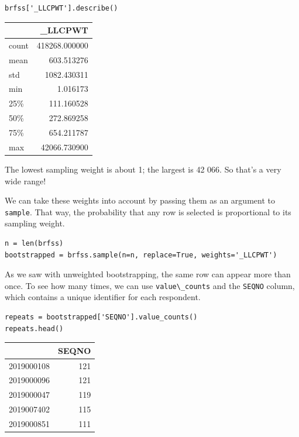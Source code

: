 \begin{lstlisting}[]
brfss['_LLCPWT'].describe()
\end{lstlisting}

\begin{tabular}{lr}
\midrule
{} &        \_LLCPWT \\
\midrule
count &  418268.000000 \\
mean  &     603.513276 \\
std   &    1082.430311 \\
min   &       1.016173 \\
25\%   &     111.160528 \\
50\%   &     272.869258 \\
75\%   &     654.211787 \\
max   &   42066.730900 \\
\midrule
\end{tabular}

The lowest sampling weight is about 1; the largest is 42 066. So that's
a very wide range!

We can take these weights into account by passing them as an argument to
\passthrough{\lstinline!sample!}. That way, the probability that any row
is selected is proportional to its sampling weight.

\begin{lstlisting}[]
n = len(brfss)
bootstrapped = brfss.sample(n=n, replace=True, weights='_LLCPWT')
\end{lstlisting}

As we saw with unweighted bootstrapping, the same row can appear more
than once. To see how many times, we can use
\passthrough{\lstinline!value\_counts!} and the
\passthrough{\lstinline!SEQNO!} column, which contains a unique
identifier for each respondent.

\begin{lstlisting}[]
repeats = bootstrapped['SEQNO'].value_counts()
repeats.head()
\end{lstlisting}

\begin{tabular}{lr}
\midrule
{} &  SEQNO \\
\midrule
2019000108 &    121 \\
2019000096 &    121 \\
2019000047 &    119 \\
2019007402 &    115 \\
2019000851 &    111 \\
\midrule
\end{tabular}

